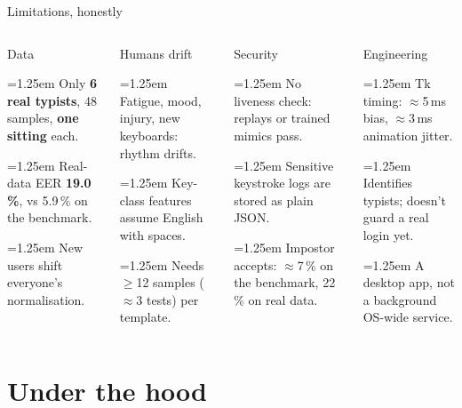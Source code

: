 \documentclass[aspectratio=169,11pt,t]{beamer}
\newcommand\secsub{}
\newcommand\badline[1]{\par\noindent\hangindent=1.25em\hangafter=1%
  \makebox[1.25em][l]{\textcolor{rose}{\scriptsize\faTimes}}#1}
\begin{document}
\begin{frame}{Limitations, honestly}
\begin{columns}[T,onlytextwidth]
\begin{card}[rose]{\faDatabase\enspace Data}
\scriptsize
\badline{Only \textbf{6 real typists}, 48 samples, \textbf{one sitting} each.}
\badline{Real-data EER \textbf{19.0\,\%}, vs 5.9\,\% on the benchmark.}
\badline{New users shift everyone's normalisation.}
\end{card}
\begin{card}[amber]{\faUserClock\enspace Humans drift}
\scriptsize
\badline{Fatigue, mood, injury, new keyboards: rhythm drifts.}
\badline{Key-class features assume English with spaces.}
\badline{Needs \(\ge\)12 samples (\(\approx\)3 tests) per template.}
\end{card}
\begin{card}[terradk]{\enspace Security}
\scriptsize
\badline{No liveness check: replays or trained mimics pass.}
\badline{Sensitive keystroke logs are stored as plain JSON.}
\badline{Impostor accepts: \(\approx\)7\,\% on the benchmark, 22\,\% on real data.}
\end{card}
\begin{card}[sky]{\faMicrochip\enspace Engineering}
\scriptsize
\badline{Tk timing: \(\approx\)5\,ms bias, \(\approx\)3\,ms animation jitter.}
\badline{Identifies typists; doesn't guard a real login yet.}
\badline{A desktop app, not a background OS-wide service.}
\end{card}
\end{columns}
\end{frame}

\renewcommand\secsub{From a key press to a verdict: capture, signals, spectrum, features, templates, decisions, and how we measured it.}
\section{Under the hood}
\end{document}

